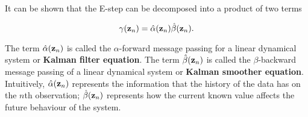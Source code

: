 \documentclass[11pt]{article}
\begin{document}
It can be shown that the E-step can be decomposed into a product of two terms

\begin{equation}
	\gamma({\bf z}_n) = \hat\alpha({\bf z}_n)\hat\beta({\bf z}_n).
\end{equation}

The term $\hat\alpha({\bf z}_n)$ is called the $\alpha$-forward message passing for a linear dynamical system or \textbf{Kalman filter equation}.  The term $\hat\beta({\bf z}_n)$ is called the $\beta$-backward message passing of a linear dynamical system or \textbf{Kalman smoother equation}. Intuitively, $\hat\alpha({\bf z}_n)$ represents the information that the history of the data has on the $n$th observation; $\hat\beta({\bf z}_n)$ represents how the current known value affects the future behaviour of the system.
\end{document}
